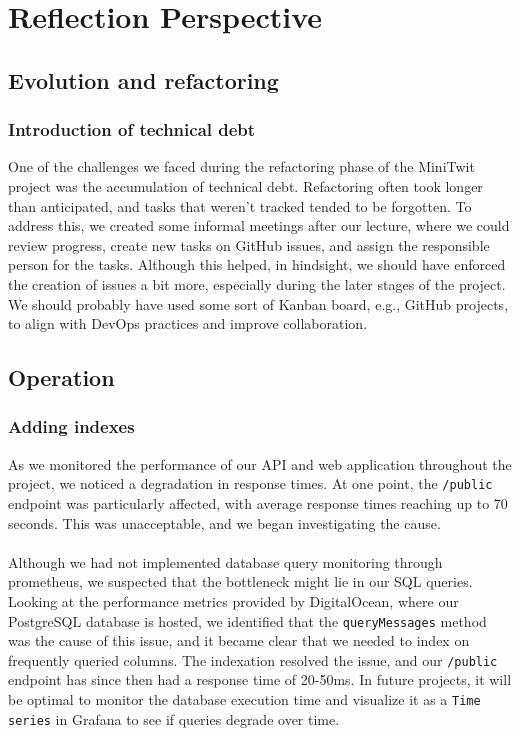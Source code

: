 \section{Reflection Perspective}
\subsection{Evolution and refactoring}
\subsubsection{Introduction of technical debt}
One of the challenges we faced during the refactoring phase of the MiniTwit project was the accumulation of technical debt. Refactoring often took longer than anticipated, and tasks that weren’t tracked tended to be forgotten. To address this, we created some informal meetings after our lecture, where we could review progress, create new tasks on GitHub issues, and assign the responsible person for the tasks. Although this helped, in hindsight, we should have enforced the creation of issues a bit more, especially during the later stages of the project. We should probably have used some sort of Kanban board, e.g., GitHub projects, to align with DevOps practices \cite{devopsculture} and improve collaboration.

\subsection{Operation}\label{operation}
\subsubsection{Adding indexes}
As we monitored the performance of our API and web application throughout the project, we noticed a degradation in response times. At one point, the \texttt{/public} endpoint was particularly affected, with average response times reaching up to 70 seconds. This was unacceptable, and we began investigating the cause.
\\\\
Although we had not implemented database query monitoring through prometheus, we suspected that the bottleneck might lie in our SQL queries. Looking at the performance metrics provided by DigitalOcean, where our PostgreSQL database is hosted, we identified that the \texttt{queryMessages} method was the cause of this issue, and it became clear that we needed to index on frequently queried columns. The indexation resolved the issue, and our \texttt{/public} endpoint has since then had a response time of 20-50ms. In future projects, it will be optimal to monitor the database execution time and visualize it as a \texttt{Time series} in Grafana to see if queries degrade over time.

